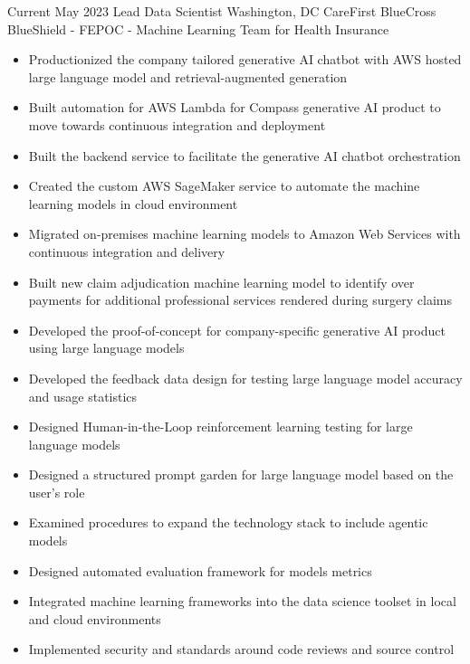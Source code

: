 
\ProjectExperienceTwoSection
{Current}
{May 2023}
{Lead Data Scientist}
{Washington, DC}
{CareFirst BlueCross BlueShield - FEPOC - Machine Learning Team for Health
Insurance}
{
    \begin{itemize}
        \item Productionized the company tailored generative AI chatbot with AWS
        hosted large language model and retrieval-augmented generation
        \item Built automation for AWS Lambda for Compass generative AI
        product to move towards continuous integration and deployment
        \item Built the backend service to facilitate the generative AI
        chatbot orchestration
        \item Created the custom AWS SageMaker service to automate the machine
        learning models in cloud environment
        \item Migrated on-premises machine learning models to Amazon Web
        Services with continuous integration and delivery
        \item Built new claim adjudication machine learning model to identify
        over payments for additional professional services rendered during
        surgery claims
    \end{itemize}
}
{
    \begin{itemize}
        \item Developed the proof-of-concept for company-specific generative
        AI product using large language models
        \item Developed the feedback data design for testing large language
        model accuracy and usage statistics
        \item Designed Human-in-the-Loop reinforcement learning testing for
        large language models
        \item Designed a structured prompt garden for large language model
        based on the user's role
        \item Examined procedures to expand the technology stack to include
        agentic models
        \item Designed automated evaluation framework for models metrics
        \item Integrated machine learning frameworks into the data science
        toolset in local and cloud environments
        \item Implemented security and standards around code reviews and source
        control
    \end{itemize}
}
